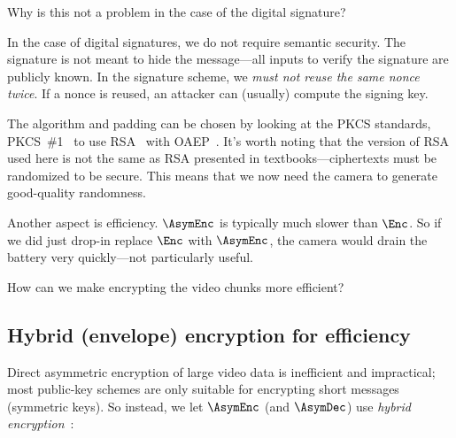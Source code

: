 \begin{exercise}
  Why is this not a problem in the case of the digital signature?
\end{exercise}

\begin{solution}
  In the case of digital signatures, we do not require semantic security.
  The signature is not meant to hide the message---all inputs to verify the 
  signature are publicly known.
  In the signature scheme, we \emph{must not reuse the same nonce twice}.
  If a nonce is reused, an attacker can (usually) compute the signing key.
\end{solution}

The algorithm and padding can be chosen by looking at the PKCS standards,
\eg PKCS\ \#1~\autocite{RFC8017} to use RSA~\autocite{RSA1978} with
OAEP~\autocite{BellareRogaway1994oaep}.
It's worth noting that the version of RSA used here is not the same as RSA
presented in textbooks---ciphertexts must be randomized to be secure.
This means that we now need the camera to generate good-quality randomness.

Another aspect is efficiency.
\(\AsymEnc\) is typically much slower than \(\Enc\).
So if we did just drop-in replace \(\Enc\) with \(\AsymEnc\), the camera would 
drain the battery very quickly---not particularly useful.

\begin{exercise}
  How can we make encrypting the video chunks more efficient?
\end{exercise}

\subsection{Hybrid (envelope) encryption for efficiency}

Direct asymmetric encryption of large video data is inefficient and 
impractical; most public-key schemes are only suitable for encrypting short 
messages (\eg symmetric keys).
So instead, we let \(\AsymEnc\) (and \(\AsymDec\)) use \emph{hybrid
encryption}~\autocite{CramerShoup2003hybrid}:


